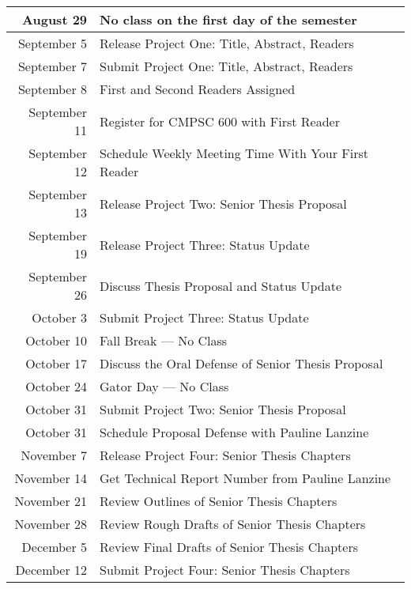 \documentclass[11pt]{article}
\begin{document}
\begin{center}
\begin{longtable}{r|l}

\hline

August 29 & No class on the first day of the semester \\

\hline

September 5  & Release Project One: Title, Abstract, Readers       \\
September 7  & Submit Project One: Title, Abstract, Readers        \\
September 8  & First and Second Readers Assigned                   \\
September 11 & Register for CMPSC 600 with First Reader            \\
September 12 & Schedule Weekly Meeting Time With Your First Reader \\
September 13 & Release Project Two: Senior Thesis Proposal         \\
September 19 & Release Project Three: Status Update \\
September 26 & Discuss Thesis Proposal and Status Update \\

\hline

October 3  & Submit Project Three: Status Update                \\
October 10 & Fall Break --- No Class                            \\
October 17 & Discuss the Oral Defense of Senior Thesis Proposal \\
October 24 & Gator Day --- No Class                             \\
October 31 & Submit Project Two: Senior Thesis Proposal         \\
October 31 & Schedule Proposal Defense with Pauline Lanzine     \\

\hline

November 7  & Release Project Four: Senior Thesis Chapters     \\
November 14 & Get Technical Report Number from Pauline Lanzine \\
November 21 & Review Outlines of Senior Thesis Chapters        \\
November 28 & Review Rough Drafts of Senior Thesis Chapters    \\

\hline

December 5  & Review Final Drafts of Senior Thesis Chapters \\
December 12 & Submit Project Four: Senior Thesis Chapters   \\


\end{longtable}
\end{center}
\end{document}

